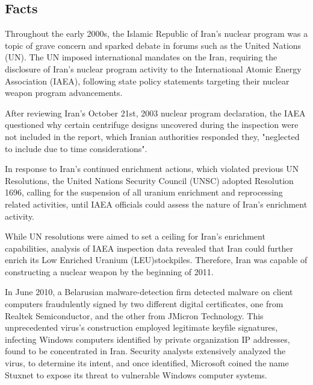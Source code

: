\documentclass[12pt]{article}
\begin{document}
\begin{multicols}{2}

\section{Facts}

Throughout the early 2000s, the Islamic Republic of Iran's nuclear program was a topic of grave concern and sparked debate in forums such as the United Nations (UN).\cite{unitedNationsResolutions} The UN imposed international mandates on the Iran, requiring the disclosure of Iran's nuclear program activity to the International Atomic Energy Association (IAEA), following state policy statements targeting their nuclear weapon program advancements. 

After reviewing Iran's October 21st, 2003 nuclear program declaration, the IAEA questioned why certain centrifuge designs uncovered during the inspection were not included in the report, which Iranian authorities responded they, "neglected to include due to time considerations".\cite{implementationOfNPTSafeguards}

In response to Iran's continued enrichment actions, which violated previous UN Resolutions, the United Nations Security Council (UNSC) adopted Resolution 1696, calling for the suspension of all uranium enrichment and reprocessing related activities, until IAEA officials could assess the nature of Iran's enrichment activity.\cite{resolution1696}

While UN resolutions were aimed to set a ceiling for Iran's enrichment capabilities, analysis of IAEA inspection data revealed that Iran could further enrich its Low Enriched Uranium (LEU)\footnotemark[1] stockpiles.  Therefore, Iran was capable of constructing a nuclear weapon by the beginning of 2011.\cite{hasIranAchievedaNuclearWeapon}


In June 2010, a Belarusian malware-detection firm detected malware on client computers fraudulently signed by two different digital certificates, one from Realtek Semiconductor, and the other from JMicron Technology.\cite{theRealStoryOfStuxnet} This unprecedented virus's construction employed legitimate keyfile signatures, infecting Windows computers identified by private organization IP addresses, found to be concentrated in Iran.\cite{w32.stuxnetDossier} Security analysts extensively analyzed the virus, to determine its intent, and once identified, Microsoft coined the name Stuxnet to expose its threat to vulnerable Windows computer systems.\cite{microsoftCoinsStuxnet}


\end{multicols}
\end{document}
